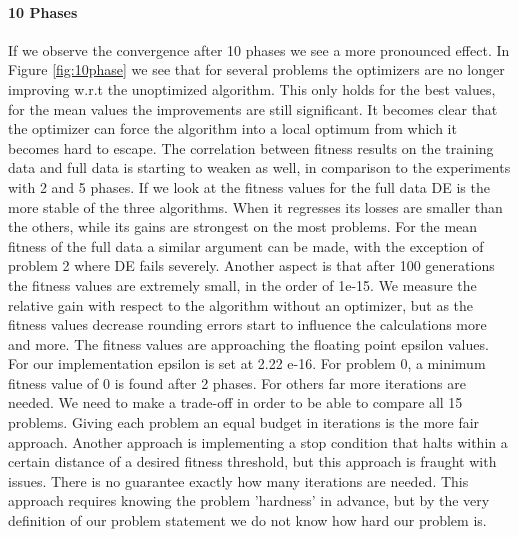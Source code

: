 \paragraph{10 Phases}
If we observe the convergence after 10 phases we see a more pronounced effect. In Figure \ref{fig:10phase} we see that for several problems the optimizers are no longer improving w.r.t the unoptimized algorithm. This only holds for the best values, for the mean values the improvements are still significant. It becomes clear that the optimizer can force the algorithm into a local optimum from which it becomes hard to escape. The correlation between fitness results on the training data and full data is starting to weaken as well, in comparison to the experiments with 2 and 5 phases. 
If we look at the fitness values for the full data DE is the more stable of the three algorithms. When it regresses its losses are smaller than the others, while its gains are strongest on the most problems. For the mean fitness of the full data a similar argument can be made, with the exception of problem 2 where DE fails severely.
Another aspect is that after 100 generations the fitness values are extremely small, in the order of 1e-15. We measure the relative gain with respect to the algorithm without an optimizer, but as the fitness values decrease rounding errors start to influence the calculations more and more. The fitness values are approaching the floating point epsilon values. For our implementation epsilon is set at 2.22 e-16. For problem 0, a minimum fitness value of 0 is found after 2 phases. For others far more iterations are needed. We need to make a trade-off in order to be able to compare all 15 problems. Giving each problem an equal budget in iterations is the more fair approach. Another approach is implementing a stop condition that halts within a certain distance of a desired fitness threshold, but this approach is fraught with issues. There is no guarantee exactly how many iterations are needed. This approach requires knowing the problem 'hardness' \cite{GPHardness} in advance, but by the very definition of our problem statement we do not know how hard our problem is. 